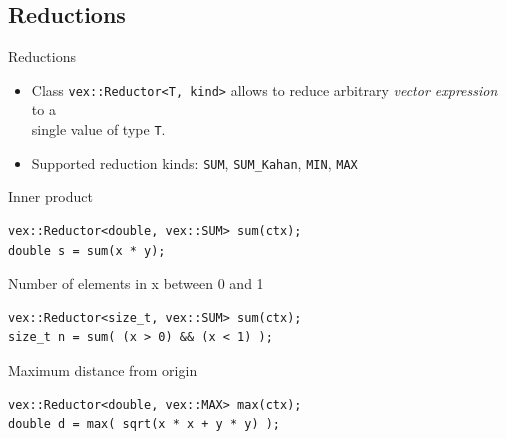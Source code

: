 \documentclass[@BEAMER_OPTIONS@]{beamer}
\newcommand{\code}[1]{\lstinline|#1|}
\begin{document}
\subsection{Reductions}

\begin{frame}[fragile]{Reductions}
    \begin{itemize}
        \item Class \code{vex::Reductor<T, kind>} allows to reduce arbitrary
            \emph{vector expression} to a\\ single value of type \code{T}.
        \item Supported reduction kinds: \code{SUM}, \code{SUM_Kahan},
            \code{MIN}, \code{MAX}
    \end{itemize}
    \begin{exampleblock}{Inner product}
        \begin{lstlisting}
vex::Reductor<double, vex::SUM> sum(ctx);
double s = sum(x * y);
        \end{lstlisting}
    \end{exampleblock}
    \begin{exampleblock}{Number of elements in x between 0 and 1}
        \begin{lstlisting}
vex::Reductor<size_t, vex::SUM> sum(ctx);
size_t n = sum( (x > 0) && (x < 1) );
        \end{lstlisting}
    \end{exampleblock}
    \begin{exampleblock}{Maximum distance from origin}
        \begin{lstlisting}
vex::Reductor<double, vex::MAX> max(ctx);
double d = max( sqrt(x * x + y * y) );
        \end{lstlisting}
    \end{exampleblock}
\end{frame}

\end{document}
